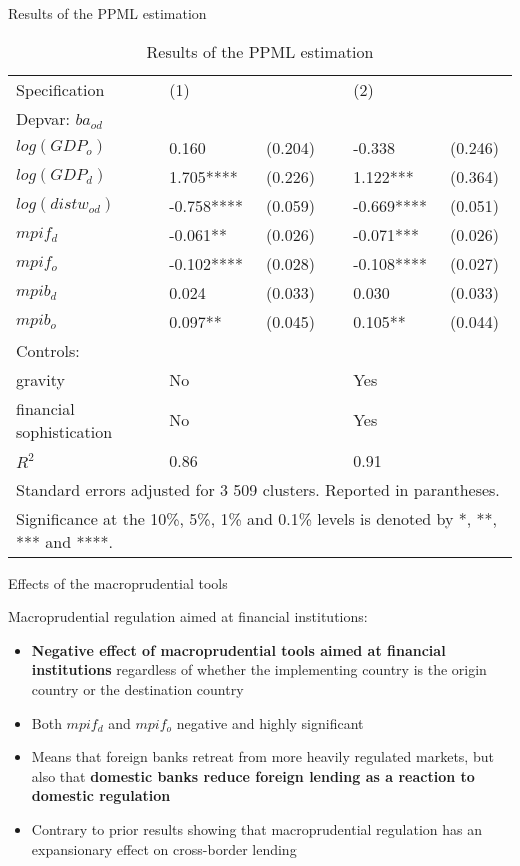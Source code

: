 \documentclass{beamer}
\begin{document}
\begin{frame}{Results of the PPML estimation}
\begin{table}[!h]
\tiny
\centering
\begin{tabular}{ l l l l l l}
\hline
Specification&(1)&&&(2)& \\
Depvar: $ba_{od}$&&&&&\\
\hline
$log(GDP_{o})$&0.160&(0.204)&&-0.338&(0.246)\\
$log(GDP_{d})$&1.705****&(0.226)&&1.122***&(0.364)\\
$log(distw_{od})$&-0.758****&(0.059)&&-0.669****&(0.051)\\
$mpif_{d}$&-0.061**&(0.026)&&-0.071***&(0.026)\\
$mpif_{o}$&-0.102****&(0.028)&&-0.108****&(0.027)\\
$mpib_{d}$&0.024&(0.033)&&0.030&(0.033)\\
$mpib_{o}$&0.097**&(0.045)&&0.105**&(0.044)\\
Controls:&&&&&\\
gravity &No&&&Yes& \\ 
financial sophistication &No&&&Yes& \\
\hline
$R^2$&0.86&&&0.91&\\
\hline
\multicolumn{6}{l}{Standard errors adjusted for 3 509 clusters. Reported in parantheses. }\\
\hline
\multicolumn{6}{l}{\tiny Significance at the 10\%, 5\%, 1\% and 0.1\% levels is denoted by *, **, *** and ****.}\\
\end{tabular}
\caption{Results of the PPML estimation}
\label{tab:results}
\end{table}
\end{frame}

\begin{frame}{Effects of the macroprudential tools}
    \begin{block}{Macroprudential regulation aimed at financial institutions:}
    \begin{itemize}
        \item \textbf{Negative effect of macroprudential tools aimed at financial institutions} regardless of whether the implementing country is the origin country or the destination country
        \item Both $mpif_{d}$ and $mpif_{o}$ negative and highly significant
        \item Means that foreign banks retreat from more heavily regulated markets, but also that \textbf{domestic banks reduce foreign lending as a reaction to domestic regulation}
        \item Contrary to prior results showing that macroprudential regulation has an expansionary effect on cross-border lending
    \end{itemize}
    \end{block}
\end{frame}
\end{document}
